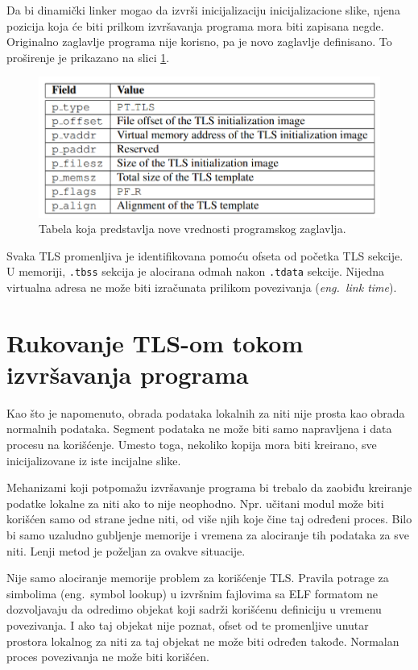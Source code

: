 \documentclass[12pt,oneside]{memoir}
\begin{document}
Da bi dinamički linker mogao da izvrši inicijalizaciju inicijalizacione slike, njena pozicija koja će biti prilkom izvršavanja programa mora biti zapisana negde. Originalno zaglavlje programa nije korisno, pa je novo zaglavlje definisano. To proširenje je prikazano na slici \ref{fig:tls_prheader}.

\begin{figure}[h!]
	\begin{center}
		\includegraphics[scale=0.6]{slike/tabela2ProgramTLSheader.png}
	\end{center}
	\caption{Tabela koja predstavlja nove vrednosti programskog zaglavlja.}
	\label{fig:tls_prheader}
\end{figure}


Svaka TLS promenljiva je identifikovana pomoću ofseta od početka TLS sekcije. U memoriji, \texttt{.tbss} sekcija je alocirana odmah nakon \texttt{.tdata} sekcije. Nijedna virtualna adresa ne može biti izračunata prilikom povezivanja (\emph{eng.~link time}).

\section{Rukovanje TLS-om tokom izvršavanja programa}

Kao što je napomenuto, obrada podataka lokalnih za niti nije prosta kao obrada normalnih podataka. Segment podataka ne može biti samo napravljena i data procesu na korišćenje. Umesto toga, nekoliko kopija mora biti kreirano, sve inicijalizovane iz iste incijalne slike.

Mehanizami koji potpomažu izvršavanje programa bi trebalo da zaobiđu kreiranje podatke lokalne za niti ako to nije neophodno. Npr. učitani modul može biti korišćen samo od strane jedne niti, od više njih koje čine taj određeni proces. Bilo bi samo uzaludno gubljenje memorije i vremena za alociranje tih podataka za sve niti. Lenji metod je poželjan za ovakve situacije.

Nije samo alociranje memorije problem za korišćenje TLS. Pravila potrage za simbolima (eng.~symbol lookup) u izvršnim fajlovima sa ELF formatom ne dozvoljavaju da odredimo objekat koji sadrži korišćenu definiciju u vremenu povezivanja. I ako taj objekat nije poznat, ofset od te promenljive unutar prostora lokalnog za niti za taj objekat ne može biti određen takođe. Normalan proces povezivanja ne može biti korišćen.
\end{document}
